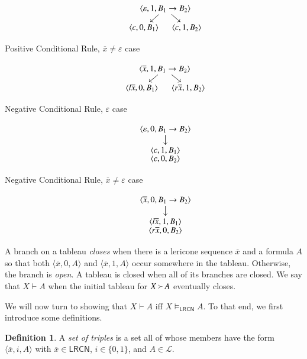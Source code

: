 \documentclass{amsart}
\theoremstyle{definition}
\newtheorem{mdef}{Definition}
\newcommand{\LL}{\mathcal{L}}
\newcommand{\LRCN}{\mathsf{LRCN}}
\begin{document}
\begin{multicols}{2}
\begin{description}
    \begin{displaymath}
        \xymatrix@C=-10mm@R=3mm{& \langle\varepsilon,1,B_1\to B_2\rangle\ar[dr]\ar[dl] & \\
        \langle c,0,B_1\rangle & &\langle c,1,B_2\rangle}
    \end{displaymath}
    \item[Positive Conditional Rule, $\overline{x}\neq\varepsilon$ case]
    \begin{displaymath}
        \xymatrix@C=-10mm@R=3mm{& \langle\overline{x},1,B_1\to B_2\rangle\ar[dr]\ar[dl] & \\
        \langle l\overline{x},0,B_1\rangle & &\langle r\overline{x},1,B_2\rangle}
    \end{displaymath}
    \item[Negative Conditional Rule, $\varepsilon$ case]
    \begin{displaymath}
        \xymatrix@C=-10mm@R=3mm{\langle\varepsilon,0,B_1\to B_2\rangle\ar[d] \\
        \txt{$\langle c,1,B_1\rangle$ \\ $\langle c,0,B_2\rangle$}}
    \end{displaymath}
    \item[Negative Conditional Rule, $\overline{x}\neq\varepsilon$ case]
    \begin{displaymath}
        \xymatrix@C=-10mm@R=3mm{\langle\overline{x},0,B_1\to B_2\rangle\ar[d] \\
        \txt{$\langle l\overline{x},1,B_1\rangle$ \\ $\langle r\overline{x},0,B_2\rangle$}}
    \end{displaymath}
\end{description}\end{multicols}

A branch on a tableau \textit{closes} when there is a lericone sequence $\overline{x}$ and a formula $A$ so that both $\langle \overline{x},0,A\rangle$ and $\langle\overline{x},1,A\rangle$ occur somewhere in the tableau. Otherwise, the branch is \textit{open}. A tableau is closed when all of its branches are closed. We say that $X\vdash A$ when the initial tableau for $X\Yright A$ eventually closes.

We will now turn to showing that $X\vdash A$ iff $X\vDash_{\LRCN} A$. To that end, we first introduce some definitions.

\begin{mdef}
    A \emph{set of triples} is a set all of whose members have the form $\langle\overline{x},i,A\rangle$ with $\overline{x}\in\LRCN$, $i\in\{0,1\}$, and $A\in\LL$.
\end{mdef}
\end{document}
